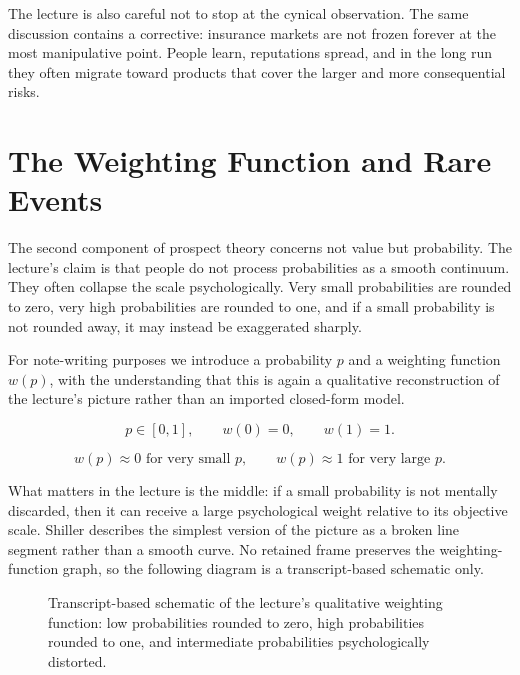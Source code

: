 The lecture is also careful not to stop at the cynical observation. The same discussion contains a corrective: insurance markets are not frozen forever at the most manipulative point. People learn, reputations spread, and in the long run they often migrate toward products that cover the larger and more consequential risks.

\section{The Weighting Function and Rare Events}

The second component of prospect theory concerns not value but probability. The lecture's claim is that people do not process probabilities as a smooth continuum. They often collapse the scale psychologically. Very small probabilities are rounded to zero, very high probabilities are rounded to one, and if a small probability is not rounded away, it may instead be exaggerated sharply.

For note-writing purposes we introduce a probability \(p\) and a weighting function \(w(p)\), with the understanding that this is again a qualitative reconstruction of the lecture's picture rather than an imported closed-form model.

\begin{equation}
p\in[0,1], \qquad w(0)=0, \qquad w(1)=1.
\end{equation}

\begin{equation}
w(p)\approx 0 \text{ for very small } p, \qquad
w(p)\approx 1 \text{ for very large } p.
\end{equation}

What matters in the lecture is the middle: if a small probability is not mentally discarded, then it can receive a large psychological weight relative to its objective scale. Shiller describes the simplest version of the picture as a broken line segment rather than a smooth curve. No retained frame preserves the weighting-function graph, so the following diagram is a transcript-based schematic only.

\begin{figure}[h]
\centering
{}
\caption{Transcript-based schematic of the lecture's qualitative weighting function: low probabilities rounded to zero, high probabilities rounded to one, and intermediate probabilities psychologically distorted.}
\end{figure}

